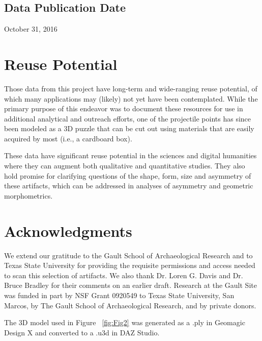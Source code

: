 \documentclass[preprint,12pt]{elsarticle}
\begin{document}
\subsection{Data Publication Date}

October 31, 2016

\section{Reuse Potential}

Those data from this project have long-term and wide-ranging reuse potential, of which many applications may (likely) not yet have been contemplated. While the primary purpose of this endeavor was to document these resources for use in additional analytical and outreach efforts, one of the projectile points has since been modeled as a 3D puzzle that can be cut out using materials that are easily acquired by most (i.e., a cardboard box). 

These data have significant reuse potential in the sciences and digital humanities where they can augment both qualitative and quantitative studies. They also hold promise for clarifying questions of the shape, form, size and asymmetry of these artifacts, which can be addressed in analyses of asymmetry and geometric morphometrics. 

\section*{Acknowledgments}

We extend our gratitude to the Gault School of Archaeological Research and to Texas State University for providing the requisite permissions and access needed to scan this selection of artifacts. We also thank Dr. Loren G. Davis and Dr. Bruce Bradley for their comments on an earlier draft. Research at the Gault Site was funded in part by NSF Grant 0920549 to Texas State University, San Marcos, by The Gault School of Archaeological Research, and by private donors.

The 3D model used in Figure ~\ref{fig:Fig2} was generated as a .ply in Geomagic Design X and converted to a .u3d in DAZ Studio.



\end{document}
